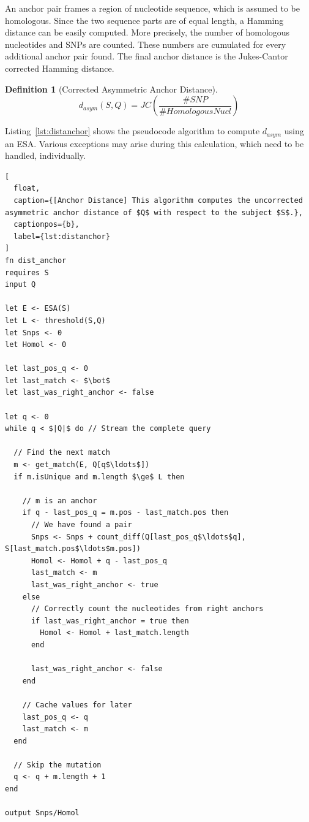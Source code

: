 \documentclass[a4paper,
  10pt,
  english,
  DIV=12,
  BCOR=8mm]{scrbook}
\newtheorem{definition}{Definition}
\begin{document}
An anchor pair frames a region of nucleotide sequence, which is assumed to be homologous. Since the two sequence parts are of equal length, a Hamming distance can be easily computed. More precisely, the number of homologous nucleotides and \acp{SNP} are counted. These numbers are cumulated for every additional anchor pair found. The final anchor distance is the Jukes-Cantor corrected Hamming distance.

\begin{definition}[Corrected Asymmetric Anchor Distance]

\[
  d_{asym}(S,Q) = \mathit{JC}\left(\frac{\#\mathit{SNP}}{\#\mathit{Homologous Nucl}}\right)
\]
\end{definition}

Listing~\ref{lst:distanchor} shows the pseudocode algorithm to compute $d_{asym}$ using an \ac{ESA}. Various exceptions may arise during this calculation, which need to be handled, individually.
\nopagebreak
\lstset{style=algo}
\begin{lstlisting}[
  float,
  caption={[Anchor Distance] This algorithm computes the uncorrected asymmetric anchor distance of $Q$ with respect to the subject $S$.},
  captionpos={b},
  label={lst:distanchor}
]
fn dist_anchor
requires S
input Q

let E <- ESA(S)
let L <- threshold(S,Q)
let Snps <- 0
let Homol <- 0

let last_pos_q <- 0
let last_match <- $\bot$
let last_was_right_anchor <- false

let q <- 0
while q < $|Q|$ do // Stream the complete query

  // Find the next match
  m <- get_match(E, Q[q$\ldots$])
  if m.isUnique and m.length $\ge$ L then

    // m is an anchor
    if q - last_pos_q = m.pos - last_match.pos then
      // We have found a pair
      Snps <- Snps + count_diff(Q[last_pos_q$\ldots$q], S[last_match.pos$\ldots$m.pos])
      Homol <- Homol + q - last_pos_q
      last_match <- m
      last_was_right_anchor <- true
    else
      // Correctly count the nucleotides from right anchors
      if last_was_right_anchor = true then
        Homol <- Homol + last_match.length
      end

      last_was_right_anchor <- false
    end

    // Cache values for later
    last_pos_q <- q
    last_match <- m
  end

  // Skip the mutation
  q <- q + m.length + 1
end

output Snps/Homol
\end{lstlisting}
\lstset{style=shell}
\end{document}
